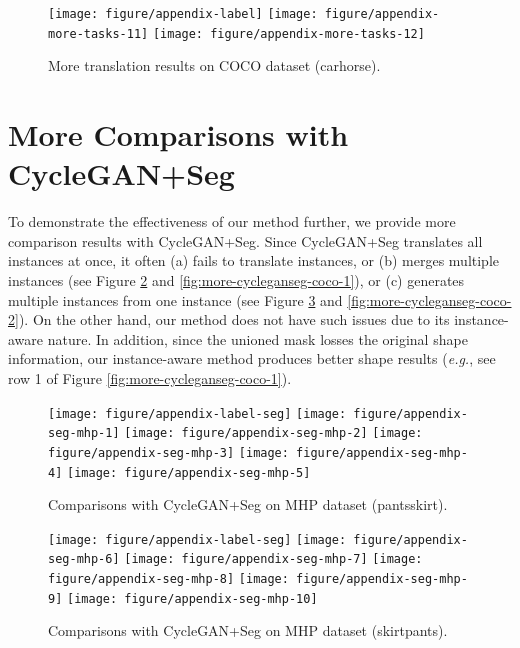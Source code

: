 \documentclass{article} \usepackage{iclr2019_conference,times}
\begin{document}
\begin{figure}[H]
	\centering
	\texttt{[image: figure/appendix-label]}
	\texttt{[image: figure/appendix-more-tasks-11]}
    \texttt{[image: figure/appendix-more-tasks-12]}
	\caption{
	More translation results on COCO dataset (carhorse).
	} \label{fig:more-tasks-6}
\end{figure}








\newpage
\section{More Comparisons with CycleGAN+Seg}
\label{sec:more-comparison}
To demonstrate the effectiveness of our method further,
we provide more comparison results with CycleGAN+Seg. Since CycleGAN+Seg translates all instances at once, it often
(a) fails to translate instances, or (b) merges multiple instances
(see Figure \ref{fig:more-cycleganseg-mhp-1} and \ref{fig:more-cycleganseg-coco-1}),
or (c) generates multiple instances from one instance
(see Figure \ref{fig:more-cycleganseg-mhp-2} and \ref{fig:more-cycleganseg-coco-2}).
On the other hand, our method does not have such issues due to its instance-aware nature.
In addition, since the unioned mask losses the original shape information,
our instance-aware method produces better shape results
(\textit{e.g.}, see row 1 of Figure \ref{fig:more-cycleganseg-coco-1}).

\begin{figure}[h]
	\centering
	\texttt{[image: figure/appendix-label-seg]}
	\texttt{[image: figure/appendix-seg-mhp-1]}
	\texttt{[image: figure/appendix-seg-mhp-2]}
	\texttt{[image: figure/appendix-seg-mhp-3]}
	\texttt{[image: figure/appendix-seg-mhp-4]}
	\texttt{[image: figure/appendix-seg-mhp-5]}
	\caption{
	Comparisons with CycleGAN+Seg on MHP dataset (pantsskirt).
	} \label{fig:more-cycleganseg-mhp-1}
\end{figure}

\begin{figure}[H]
	\centering
	\texttt{[image: figure/appendix-label-seg]}
	\texttt{[image: figure/appendix-seg-mhp-6]}
	\texttt{[image: figure/appendix-seg-mhp-7]}
	\texttt{[image: figure/appendix-seg-mhp-8]}
	\texttt{[image: figure/appendix-seg-mhp-9]}
	\texttt{[image: figure/appendix-seg-mhp-10]}
	\caption{
	Comparisons with CycleGAN+Seg on MHP dataset (skirtpants).
	} \label{fig:more-cycleganseg-mhp-2}
\end{figure}
\end{document}
